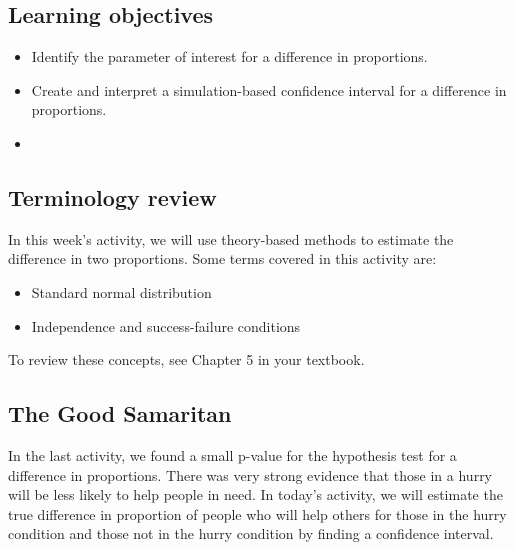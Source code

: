 \documentclass[
]{report}
\begin{document}

\hypertarget{learning-objectives-13}{%
\subsection{Learning objectives}\label{learning-objectives-13}}

\begin{itemize}
\item
  Identify the parameter of interest for a difference in proportions.
\item
  Create and interpret a simulation-based confidence interval for a difference in proportions.
\item
\end{itemize}

\hypertarget{terminology-review-16}{%
\subsection{Terminology review}\label{terminology-review-16}}

In this week's activity, we will use theory-based methods to estimate the difference in two proportions. Some terms covered in this activity are:

\begin{itemize}
\item
  Standard normal distribution
\item
  Independence and success-failure conditions
\end{itemize}

To review these concepts, see Chapter 5 in your textbook.

\hypertarget{the-good-samaritan-1}{%
\subsection{The Good Samaritan}\label{the-good-samaritan-1}}

In the last activity, we found a small p-value for the hypothesis test for a difference in proportions. There was very strong evidence that those in a hurry will be less likely to help people in need. In today's activity, we will estimate the true difference in proportion of people who will help others for those in the hurry condition and those not in the hurry condition by finding a confidence interval.
\end{document}
